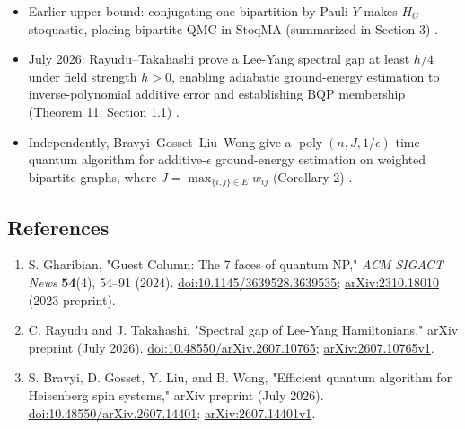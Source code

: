 \begin{itemize}
  \item Earlier upper bound: conjugating one bipartition by Pauli $Y$ makes
$H_G$ stoquastic, placing bipartite QMC in $\mathrm{StoqMA}$
(summarized in Section 3) .

  \item July 2026: Rayudu--Takahashi prove a Lee-Yang spectral gap at least
$h/4$ under field strength $h>0$, enabling adiabatic ground-energy
estimation to inverse-polynomial additive error and establishing
$\mathrm{BQP}$ membership (Theorem 11; Section 1.1)
.

  \item Independently, Bravyi--Gosset--Liu--Wong give a
$\operatorname{poly}(n,J,1/\epsilon)$-time quantum algorithm for
additive-$\epsilon$ ground-energy estimation on weighted bipartite graphs,
where $J=\max_{\{i,j\}\in E}w_{ij}$ (Corollary 2)
.
\end{itemize}

\subsection*{References}

\begin{enumerate}[label={},leftmargin=4.8em,labelsep=0.5em]
  \footnotesize
  \item[\textup{[Gha24]}]\label{ref:bqmc-gharibian}
  S. Gharibian, "Guest Column: The 7 faces of quantum NP,"
\emph{ACM SIGACT News} \textbf{54}(4), 54--91 (2024).
\href{https://doi.org/10.1145/3639528.3639535}{doi:10.1145/3639528.3639535};
\href{https://arxiv.org/abs/2310.18010}{arXiv:2310.18010} (2023 preprint).

  \item[\textup{[RT26]}]\label{ref:bqmc-rt}
  C. Rayudu and J. Takahashi, "Spectral gap of Lee-Yang Hamiltonians,"
arXiv preprint (July 2026).
\href{https://doi.org/10.48550/arXiv.2607.10765}{doi:10.48550/arXiv.2607.10765};
\href{https://arxiv.org/abs/2607.10765v1}{arXiv:2607.10765v1}.

  \item[\textup{[BGLW26]}]\label{ref:bqmc-bglw}
  S. Bravyi, D. Gosset, Y. Liu, and B. Wong,
"Efficient quantum algorithm for Heisenberg spin systems,"
arXiv preprint (July 2026).
\href{https://doi.org/10.48550/arXiv.2607.14401}{doi:10.48550/arXiv.2607.14401};
\href{https://arxiv.org/abs/2607.14401v1}{arXiv:2607.14401v1}.
\end{enumerate}

